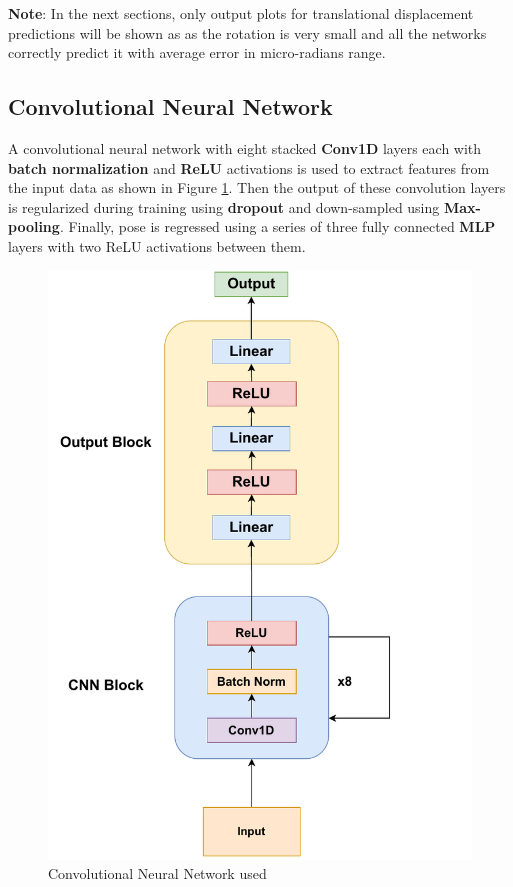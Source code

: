 \textbf{Note}: In the next sections, only output plots for translational displacement predictions will be shown as as the rotation is very small and all the networks correctly predict it with average error in micro-radians range.

\subsection{Convolutional Neural Network}
A convolutional neural network with eight stacked \textbf{Conv1D} layers each with \textbf{batch normalization} and \textbf{ReLU} activations is used to extract features from the input data as shown in Figure \ref{fig:cnn_used}. Then the output of these convolution layers is regularized during training using \textbf{dropout} and down-sampled using \textbf{Max-pooling}. Finally, pose is regressed using a series of three fully connected \textbf{MLP} layers with two ReLU activations between them.

\begin{figure}
    \centering
    \includegraphics[scale=0.85]{images/fig_chapter2/nns/cnn_mt.pdf}
    \caption{Convolutional Neural Network used}
    \label{fig:cnn_used}
\end{figure}

